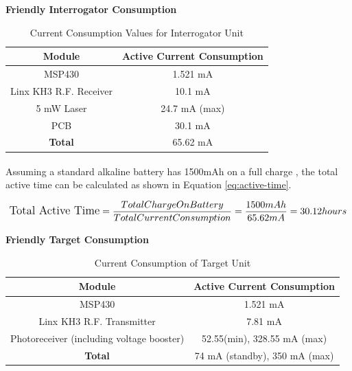 \documentclass[letterpaper,10pt]{article}
\begin{document}
\begin{spacing}{1.15}
\hspace{5mm}\textbf{Friendly Interrogator Consumption} \label{section:interrogator-consumption}
\begin{table}[H]
	\centering
	\begin{tabular}{c|c}	%
		\toprule	%
		Module & Active Current Consumption \\
		\midrule
		MSP430 & 1.521 mA \\ 
		Linx KH3 R.F. Receiver & 10.1 mA \\
		5 mW Laser & 24.7 mA (max) \\
		PCB  & 30.1 mA \\
		\bottomrule	%
		\textbf{Total} & 65.62 mA \\
	\end{tabular}%
	\caption{Current Consumption Values for Interrogator Unit}
	\label{tab:table2}	%
\end{table}%

Assuming a standard alkaline battery has 1500mAh on a full charge \textsuperscript{\cite{Battery}}, the total active time can be calculated as shown in Equation \ref{eq:active-time}.

\begin{equation}  \large \label{eq:active-time}
	\textrm{Total Active Time} = \frac{Total Charge On Battery}{Total Current Consumption} = \frac{1500mAh}{65.62mA} = 30.12 hours 
\end{equation}

\hspace{5mm}\textbf{Friendly Target Consumption} \label{section:ttarget-consumption}
\begin{table}[H]
	\centering
	\begin{tabular}{c|c}	%
		\toprule	%
		Module & Active Current Consumption \\
		\midrule
		MSP430 & 1.521 mA \\ 
		Linx KH3 R.F. Transmitter & 7.81 mA\\
		Photoreceiver (including voltage booster) & 52.55(min), 328.55 mA (max)\\
		\bottomrule	%
		\textbf{Total} & 74 mA (standby), 350 mA (max) \\
	\end{tabular}%
	\caption{Current Consumption of Target Unit}
	\label{tab:table2}	%
\end{table}%


\end{spacing}
\end{document}
